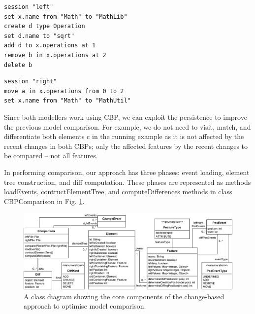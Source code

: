 \documentclass{llncs}
\begin{document}
\begin{minipage}[t]{0.49\linewidth}    
\begin{lstlisting}[firstnumber=13,style=eol,caption={The CBP of the model in Fig. \ref{fig:left} (left version).},label=lst:leftcbp]
session "left"
set x.name from "Math" to "MathLib"
create d type Operation
set d.name to "sqrt"
add d to x.operations at 1
remove b in x.operations at 2
delete b
\end{lstlisting}
\end{minipage}
\hfill
\begin{minipage}[t]{0.49\linewidth}
\begin{lstlisting}[firstnumber=13,style=eol,caption={The CBP of the model in Fig. \ref{fig:right} (right version).},label=lst:rightcbp]
session "right"
move a in x.operations from 0 to 2
set x.name from "Math" to "MathUtil"
\end{lstlisting}
\end{minipage}

Since both modellers work using CBP, we can exploit the persistence to improve the previous model comparison. For example, we do not need to visit, match, and differentiate both elements \textsf{c} in the running example as it is not affected by the recent changes in both CBPs; only the affected features by the recent changes to be compared -- not all features. 

In performing comparison, our approach has three phases: event loading, element tree construction, and diff computation. These phases are represented as methods \textsf{loadEvents}, \textsf{contructElementTree}, and \textsf{computeDifferences} methods in class \textsf{CBPComparison} in Fig. \ref{fig:approach_class_diagram}. 

\vspace{-10pt}
\begin{figure}
    \includegraphics[width=\linewidth]{images/TreeClassDiagram}
    \caption{A class diagram showing the core components of the change-based approach to optimise model comparison.}
    \label{fig:approach_class_diagram}
\end{figure}
\end{document}
